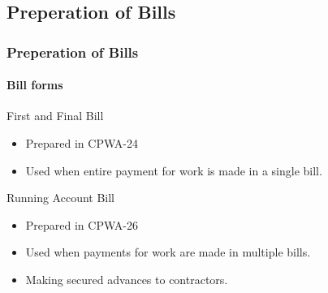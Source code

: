 \documentclass{beamer}
\begin{document}
\subsection{Preperation of Bills}
\begin{frame}
  \frametitle{Preperation of Bills}
  \framesubtitle{Bill forms}
  \begin{block}{First and Final Bill}
      \begin{itemize}
        \item<2-> Prepared in CPWA-24
        \item<3-> Used when entire payment for work is made in a single bill.
      \end{itemize}
  \end{block}
  \begin{block}{Running Account Bill}
      \begin{itemize}
        \item<4-> Prepared in CPWA-26
        \item<5-> Used when payments for work are made in multiple bills.
        \item<6-> Making secured advances to contractors.
      \end{itemize}
  \end{block}
\end{frame}
\end{document}
